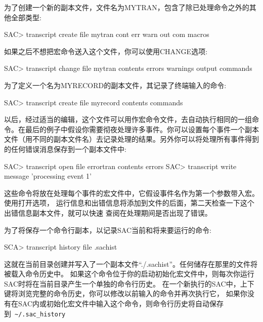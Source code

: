 为了创建一个新的副本文件，文件名为MYTRAN，包含了除已处理命令之外的其他全部类型:
\begin{SACCode}
SAC> transcript create file mytran cont err warn out com macros
\end{SACCode}

如果之后不想把宏命令送入这个文件，你可以使用CHANGE选项:
\begin{SACCode}
SAC> transcript change file mytran contents errors warnings output commands
\end{SACCode}

为了定义一个名为MYRECORD的副本文件，其记录了终端输入的命令:
\begin{SACCode}
SAC> transcript create file myrecord contents commands
\end{SACCode}

以后，经过适当的编辑，这个文件可以用作宏命令文件，去自动执行相同的一组命令。在最后的例子中假设你需要彻夜处理许多事件。你可以设置每个事件一个副本文件（用不同的副本文件名）去记录处理的结果。另外你可以将处理所有事件得到的任何错误消息保存到一个副本文件中:
\begin{SACCode}
SAC> transcript open file errortran contents errors
SAC> transcript write message 'processing event 1'
\end{SACCode}

这些命令将放在处理每个事件的宏文件中，它假设事件名作为第一个参数带入宏。使用打开选项，
运行信息和出错信息将添加到文件的后面，第二天检查一下这个出错信息副本文件，就可以快速
查阅在处理期间是否出现了错误。

为了将保存一个命令行副本，以记录SAC当前和将来要运行的命令:
\begin{SACCode}
SCA> transcript history file .sachist
\end{SACCode}
这就在当前目录创建并写入了一个副本文件``./.sachist''。任何储存在那里的文件将被载入命令历史中。
如果这个命令位于你的启动初始化宏文件中，则每次你运行SAC时将在当前目录产生一个单独的命令行历史。
在一个新执行的SAC中，上下键将浏览完整的命令历史，你可以修改以前输入的命令并再次执行它，
如果你没有在SAC内或初始化宏文件中输入这个命令，则命令行历史将自动保存到~\verb+~/.sac_history+
